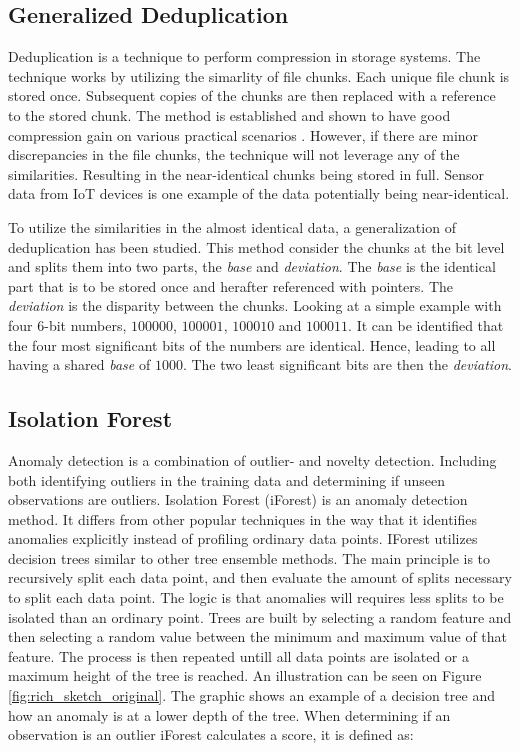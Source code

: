 
\subsection{Generalized Deduplication}
Deduplication is a technique to perform compression in storage systems. The technique works by utilizing the simarlity of file chunks. Each unique file chunk is stored once. Subsequent copies of the chunks are then replaced with a reference to the stored chunk. The method is established and shown to have good compression gain on various practical scenarios \cite{deduplication}. However, if there are minor discrepancies in the file chunks, the technique will not leverage any of the similarities. Resulting in the near-identical chunks being stored in full. Sensor data from IoT devices is one example of the data potentially being near-identical. 

To utilize the similarities in the almost identical data, a generalization of deduplication has been studied.     
This method consider the chunks at the bit level and splits them into two parts, the \textit{base} and \textit{deviation}. The \textit{base} is the identical part that is to be stored once and herafter referenced with pointers. The \textit{deviation} is the disparity between the chunks. Looking at a simple example with four 6-bit numbers, $100000$, $100001$, $100010$ and $100011$. It can be identified that the four most significant bits of the numbers are identical. Hence, leading to all having a shared \textit{base} of $1000$. The two least significant bits are then the \textit{deviation}\cite{gen-deduplication}.   

\subsection{Isolation Forest}
Anomaly detection is a combination of outlier- and novelty detection. Including both identifying outliers in the training data and determining if unseen observations are outliers. Isolation Forest (iForest) is an anomaly detection method. It differs from other popular techniques in the way that it identifies anomalies explicitly instead of profiling ordinary data points\cite{iforest}. IForest utilizes decision trees similar to other tree ensemble methods.
The main principle is to recursively split each data point, and then evaluate the amount of splits necessary to split each data point. The logic is that anomalies will requires less splits to be isolated than an ordinary point.  
Trees are built by selecting a random feature and then selecting a random value between the minimum and maximum value of that feature. The process is then repeated untill all data points are isolated or a maximum height of the tree is reached. An illustration can be seen on Figure \ref{fig:rich_sketch_original}. The graphic shows an example of a decision tree and how an anomaly is at a lower depth of the tree. When determining if an observation is an outlier iForest calculates a score, it is defined as: 

